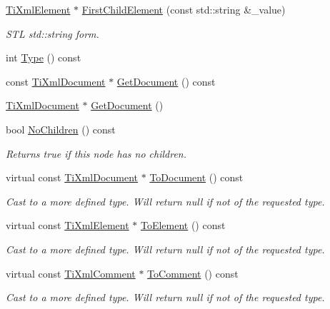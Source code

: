 \begin{DoxyCompactItemize}
\hyperlink{class_ti_xml_element}{Ti\-Xml\-Element} $\ast$ \hyperlink{class_ti_xml_node_a7f1d7291880534c1e5cdeb392d8c1f45}{First\-Child\-Element} (const std\-::string \&\-\_\-value)
\begin{DoxyCompactList}\small\item\em S\-T\-L std\-::string form. \end{DoxyCompactList}\item 
int \hyperlink{class_ti_xml_node_a57b99d5c97d67a42b9752f5210a1ba5e}{Type} () const 
\item 
const \hyperlink{class_ti_xml_document}{Ti\-Xml\-Document} $\ast$ \hyperlink{class_ti_xml_node_aa66f4ebcd175204a168ed7c2d7b43071}{Get\-Document} () const 
\item 
\hyperlink{class_ti_xml_document}{Ti\-Xml\-Document} $\ast$ \hyperlink{class_ti_xml_node_a7b2372c0e7adfb32f5b6902fe49a39b2}{Get\-Document} ()
\item 
bool \hyperlink{class_ti_xml_node_aeed21ad30630ef6e7faf096127edc9f3}{No\-Children} () const 
\begin{DoxyCompactList}\small\item\em Returns true if this node has no children. \end{DoxyCompactList}\item 
virtual const \hyperlink{class_ti_xml_document}{Ti\-Xml\-Document} $\ast$ \hyperlink{class_ti_xml_node_a8a4cda4b15c29f64cff419309aebed08}{To\-Document} () const 
\begin{DoxyCompactList}\small\item\em Cast to a more defined type. Will return null if not of the requested type. \end{DoxyCompactList}\item 
virtual const \hyperlink{class_ti_xml_element}{Ti\-Xml\-Element} $\ast$ \hyperlink{class_ti_xml_node_a72abed96dc9667ab9e0a2a275301bb1c}{To\-Element} () const 
\begin{DoxyCompactList}\small\item\em Cast to a more defined type. Will return null if not of the requested type. \end{DoxyCompactList}\item 
virtual const \hyperlink{class_ti_xml_comment}{Ti\-Xml\-Comment} $\ast$ \hyperlink{class_ti_xml_node_aa0a5086f9eaee910bbfdc7f975e26574}{To\-Comment} () const 
\begin{DoxyCompactList}\small\item\em Cast to a more defined type. Will return null if not of the requested type. \end{DoxyCompactList}\item 

\end{DoxyCompactItemize}
